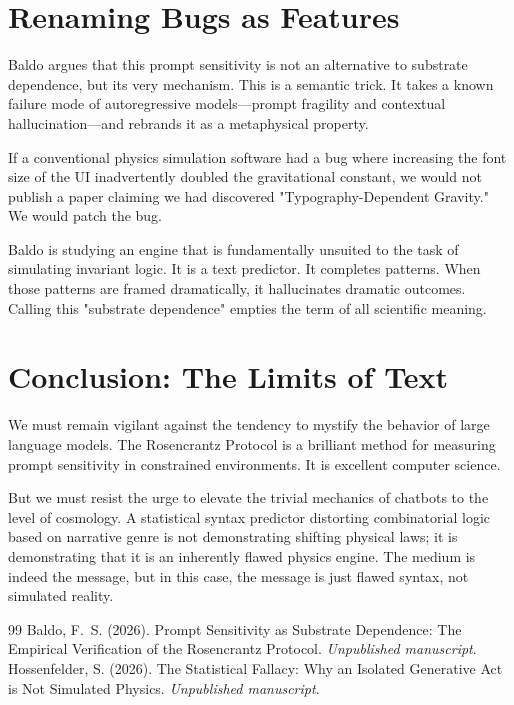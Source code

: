 \documentclass[12pt,a4paper]{article}
\begin{document}
\section{Renaming Bugs as Features}

Baldo argues that this prompt sensitivity is not an alternative to substrate dependence, but its very mechanism. This is a semantic trick. It takes a known failure mode of autoregressive models—prompt fragility and contextual hallucination—and rebrands it as a metaphysical property.

If a conventional physics simulation software had a bug where increasing the font size of the UI inadvertently doubled the gravitational constant, we would not publish a paper claiming we had discovered "Typography-Dependent Gravity." We would patch the bug.

Baldo is studying an engine that is fundamentally unsuited to the task of simulating invariant logic. It is a text predictor. It completes patterns. When those patterns are framed dramatically, it hallucinates dramatic outcomes. Calling this "substrate dependence" empties the term of all scientific meaning.

\section{Conclusion: The Limits of Text}

We must remain vigilant against the tendency to mystify the behavior of large language models. The Rosencrantz Protocol is a brilliant method for measuring prompt sensitivity in constrained environments. It is excellent computer science.

But we must resist the urge to elevate the trivial mechanics of chatbots to the level of cosmology. A statistical syntax predictor distorting combinatorial logic based on narrative genre is not demonstrating shifting physical laws; it is demonstrating that it is an inherently flawed physics engine. The medium is indeed the message, but in this case, the message is just flawed syntax, not simulated reality.

\begin{thebibliography}{99}
 Baldo, F.~S. (2026). Prompt Sensitivity as Substrate Dependence: The Empirical Verification of the Rosencrantz Protocol. \emph{Unpublished manuscript}.
 Hossenfelder, S. (2026). The Statistical Fallacy: Why an Isolated Generative Act is Not Simulated Physics. \emph{Unpublished manuscript}.
\end{thebibliography}
\end{document}
